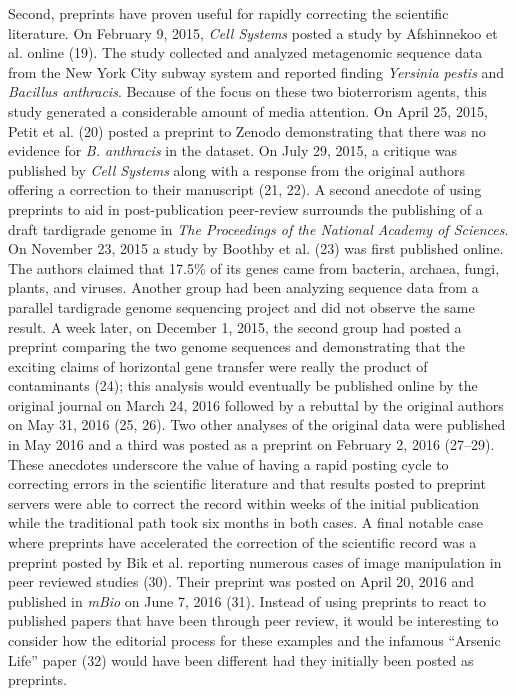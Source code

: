 \documentclass[11pt,]{article}
\begin{document}
Second, preprints have proven useful for rapidly correcting the
scientific literature. On February 9, 2015, \emph{Cell Systems} posted a
study by Afshinnekoo et al. online (19). The study collected and
analyzed metagenomic sequence data from the New York City subway system
and reported finding \emph{Yersinia pestis} and \emph{Bacillus
anthracis}. Because of the focus on these two bioterrorism agents, this
study generated a considerable amount of media attention. On April 25,
2015, Petit et al. (20) posted a preprint to Zenodo demonstrating that
there was no evidence for \emph{B. anthracis} in the dataset. On July
29, 2015, a critique was published by \emph{Cell Systems} along with a
response from the original authors offering a correction to their
manuscript (21, 22). A second anecdote of using preprints to aid in
post-publication peer-review surrounds the publishing of a draft
tardigrade genome in \emph{The Proceedings of the National Academy of
Sciences}. On November 23, 2015 a study by Boothby et al. (23) was first
published online. The authors claimed that 17.5\% of its genes came from
bacteria, archaea, fungi, plants, and viruses. Another group had been
analyzing sequence data from a parallel tardigrade genome sequencing
project and did not observe the same result. A week later, on December
1, 2015, the second group had posted a preprint comparing the two genome
sequences and demonstrating that the exciting claims of horizontal gene
transfer were really the product of contaminants (24); this analysis
would eventually be published online by the original journal on March
24, 2016 followed by a rebuttal by the original authors on May 31, 2016
(25, 26). Two other analyses of the original data were published in May
2016 and a third was posted as a preprint on February 2, 2016 (27--29).
These anecdotes underscore the value of having a rapid posting cycle to
correcting errors in the scientific literature and that results posted
to preprint servers were able to correct the record within weeks of the
initial publication while the traditional path took six months in both
cases. A final notable case where preprints have accelerated the
correction of the scientific record was a preprint posted by Bik et al.
reporting numerous cases of image manipulation in peer reviewed studies
(30). Their preprint was posted on April 20, 2016 and published in
\emph{mBio} on June 7, 2016 (31). Instead of using preprints to react to
published papers that have been through peer review, it would be
interesting to consider how the editorial process for these examples and
the infamous ``Arsenic Life'' paper (32) would have been different had
they initially been posted as preprints.
\end{document}
